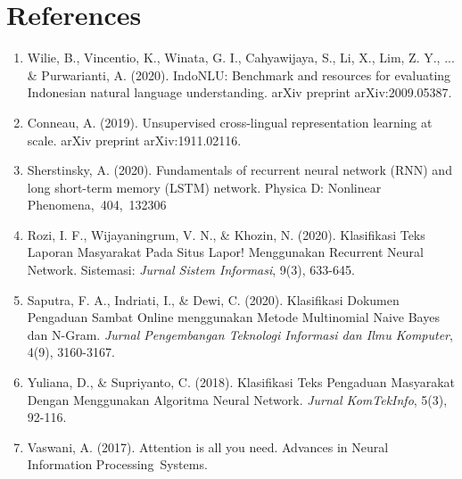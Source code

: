 \documentclass[12pt,a4paper]{article}
\begin{document}
\newpage
\section*{References}

\begin{enumerate}
    \item Wilie, B., Vincentio, K., Winata, G. I., Cahyawijaya, S., Li, X., Lim, Z. Y., ... \& Purwarianti, A. (2020). IndoNLU: Benchmark and resources for evaluating Indonesian natural language understanding. arXiv preprint arXiv:2009.05387.

    \item Conneau, A. (2019). Unsupervised cross-lingual representation learning at scale. arXiv preprint arXiv:1911.02116.

    \item Sherstinsky, A. (2020). Fundamentals of recurrent neural network (RNN) and long short-term memory (LSTM) network. Physica D: Nonlinear Phenomena, 404, 132306
    \item Rozi, I. F., Wijayaningrum, V. N., \& Khozin, N. (2020). Klasifikasi Teks Laporan Masyarakat Pada Situs Lapor! Menggunakan Recurrent Neural Network. Sistemasi: \textit{Jurnal Sistem Informasi}, 9(3), 633-645.

     \item Saputra, F. A., Indriati, I., \& Dewi, C. (2020). Klasifikasi Dokumen Pengaduan Sambat Online menggunakan Metode Multinomial Naive Bayes dan N-Gram. \textit{Jurnal Pengembangan Teknologi Informasi dan Ilmu Komputer}, 4(9), 3160-3167.

    \item Yuliana, D., \& Supriyanto, C. (2018). Klasifikasi Teks Pengaduan Masyarakat Dengan Menggunakan Algoritma Neural Network. \textit{Jurnal KomTekInfo}, 5(3), 92-116.

    \item Vaswani, A. (2017). Attention is all you need. Advances in Neural Information Processing Systems.

    

    
\end{enumerate}

\end{document}
